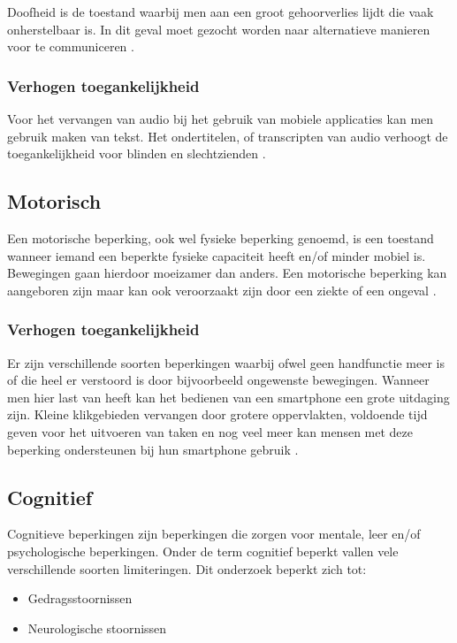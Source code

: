   Doofheid is de toestand waarbij men aan een groot gehoorverlies lijdt die vaak onherstelbaar is. In dit geval moet gezocht worden naar alternatieve manieren voor te communiceren \autocite{accessibility2019}.

\subsubsection{Verhogen toegankelijkheid}
Voor het vervangen van audio bij het gebruik van mobiele applicaties kan men gebruik maken van tekst. Het ondertitelen, of transcripten van audio verhoogt de toegankelijkheid voor blinden en slechtzienden \autocite{accessibility2019}.

\subsection{Motorisch}
\label{sec:Motorisch}
Een motorische beperking, ook wel fysieke beperking genoemd, is een toestand wanneer iemand een beperkte fysieke capaciteit heeft en/of minder mobiel is. Bewegingen gaan hierdoor moeizamer dan anders. Een motorische beperking kan aangeboren zijn maar kan ook veroorzaakt zijn door een ziekte of een ongeval  \autocite{achieveAU2019}.

\subsubsection{Verhogen toegankelijkheid}
Er zijn verschillende soorten beperkingen waarbij ofwel geen handfunctie meer is of die heel er verstoord is door bijvoorbeeld ongewenste bewegingen. Wanneer men hier last van heeft kan het bedienen van een smartphone een grote uitdaging zijn. Kleine klikgebieden vervangen door grotere oppervlakten, voldoende tijd geven voor het uitvoeren van taken en nog veel meer kan mensen met deze beperking ondersteunen bij hun smartphone gebruik  \autocite{accessibility2019}.







\subsection{Cognitief}
\label{sec:cognitief}
Cognitieve beperkingen zijn beperkingen die zorgen voor mentale, leer en/of psychologische beperkingen. Onder de term cognitief beperkt vallen vele verschillende soorten limiteringen. Dit onderzoek beperkt zich tot:
\begin{itemize}
    \item Gedragsstoornissen
    \item Neurologische stoornissen 
\end{itemize}

